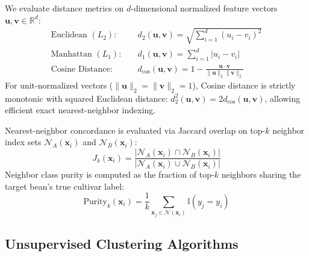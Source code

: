 \documentclass[11pt,a4paper]{article}
\begin{document}
We evaluate distance metrics on $d$-dimensional normalized feature vectors $\mathbf{u}, \mathbf{v} \in \mathbb{R}^d$:
\begin{align}
    \text{Euclidean } (L_2): \quad & d_2(\mathbf{u}, \mathbf{v}) = \sqrt{\sum_{i=1}^d (u_i - v_i)^2} \\
    \text{Manhattan } (L_1): \quad & d_1(\mathbf{u}, \mathbf{v}) = \sum_{i=1}^d |u_i - v_i| \\
    \text{Cosine Distance}: \quad & d_{\cos}(\mathbf{u}, \mathbf{v}) = 1 - \frac{\mathbf{u} \cdot \mathbf{v}}{\|\mathbf{u}\|_2 \|\mathbf{v}\|_2}
\end{align}
For unit-normalized vectors ($\|\mathbf{u}\|_2 = \|\mathbf{v}\|_2 = 1$), Cosine distance is strictly monotonic with squared Euclidean distance: $d_2^2(\mathbf{u}, \mathbf{v}) = 2 d_{\cos}(\mathbf{u}, \mathbf{v})$, allowing efficient exact nearest-neighbor indexing.

Nearest-neighbor concordance is evaluated via Jaccard overlap on top-$k$ neighbor index sets $\mathcal{N}_A(\mathbf{x}_i)$ and $\mathcal{N}_B(\mathbf{x}_i)$:
\begin{equation}
    J_k(\mathbf{x}_i) = \frac{|\mathcal{N}_A(\mathbf{x}_i) \cap \mathcal{N}_B(\mathbf{x}_i)|}{|\mathcal{N}_A(\mathbf{x}_i) \cup \mathcal{N}_B(\mathbf{x}_i)|}
\end{equation}
Neighbor class purity is computed as the fraction of top-$k$ neighbors sharing the target bean's true cultivar label:
\begin{equation}
    \text{Purity}_k(\mathbf{x}_i) = \frac{1}{k} \sum_{\mathbf{x}_j \in \mathcal{N}(\mathbf{x}_i)} \mathbb{I}(y_j = y_i)
\end{equation}

\subsection{Unsupervised Clustering Algorithms}
\label{subsec:meth_clustering}
\end{document}
